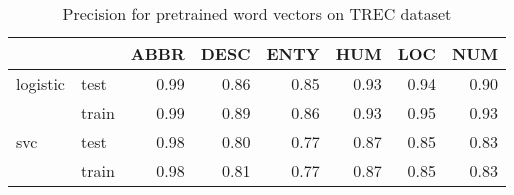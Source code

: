 \begin{table}[h]
\begin{center}

\begin{tabular}{llrrrrrr}
\toprule
 &&ABBR &DESC &ENTY &HUM &LOC &NUM \\
\midrule
logistic & test &0.99 &0.86 &0.85 & 0.93 & 0.94 & 0.90 \\
 & train &0.99 &0.89 &0.86 & 0.93 & 0.95 & 0.93 \\
svc & test &0.98 &0.80 &0.77 & 0.87 & 0.85 & 0.83 \\
 & train &0.98 &0.81 &0.77 & 0.87 & 0.85 & 0.83 \\
\bottomrule
\end{tabular}

\caption[Precision for pretrained word vectors on TREC dataset]{Precision for pretrained word vectors on TREC dataset}
\label{tab:}
\end{center}
\end{table}

